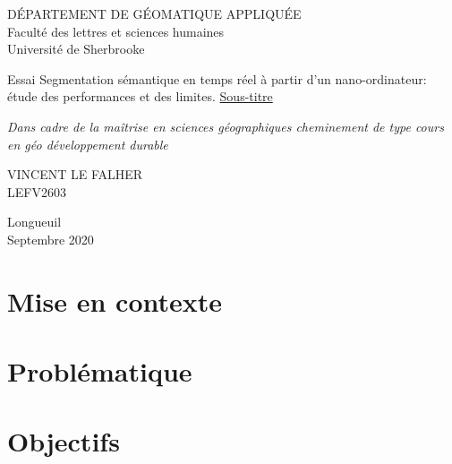 \documentclass[12pt, letterpaper]{article}
\begin{document}
\begin{titlepage} %
   \centering %
 
   \scshape %
  
   DÉPARTEMENT DE GÉOMATIQUE APPLIQUÉE\\Faculté des lettres et sciences humaines\\Université de Sherbrooke
   
   \vspace{10\baselineskip}
 
   {\LARGE Essai}
   \vspace{1\baselineskip}
   \linebreak
   {\LARGE Segmentation sémantique en temps réel à partir d'un nano-ordinateur: étude des performances et des limites.}
   \vspace{1\baselineskip}
   \linebreak
   \underline{{\LARGE Sous-titre}}
 
   \vspace*{3\baselineskip}
 
   \textit{Dans cadre de la maîtrise en sciences géographiques cheminement de type cours en géo développement durable}
   
   \vspace{5\baselineskip}
    
   VINCENT LE FALHER\\LEFV2603
     
   \vfill %
 
   Longueuil\\Septembre 2020 %
 
\end{titlepage}
\thispagestyle{empty}
\tableofcontents{}
\listoffigures{}
\listoftables{}
\newpage
{}
\section{Mise en contexte}

\section{Problématique}

\section{Objectifs}

\end{document}
